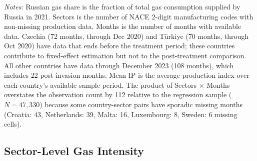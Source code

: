 \documentclass[12pt]{article}
\begin{document}
\begin{table}[H]
\begin{threeparttable}
\begin{tablenotes}[flushleft]
\item \textit{Notes:} Russian gas share is the fraction of total gas consumption supplied by Russia in 2021. Sectors is the number of NACE 2-digit manufacturing codes with non-missing production data. Months is the number of months with available data. Czechia (72 months, through Dec 2020) and T\"{u}rkiye (70 months, through Oct 2020) have data that ends before the treatment period; these countries contribute to fixed-effect estimation but not to the post-treatment comparison. All other countries have data through December 2023 (108 months), which includes 22 post-invasion months. Mean IP is the average production index over each country's available sample period. The product of Sectors $\times$ Months overstates the observation count by 112 relative to the regression sample ($N = 47{,}330$) because some country-sector pairs have sporadic missing months (Croatia: 43, Netherlands: 39, Malta: 16, Luxembourg: 8, Sweden: 6 missing cells).
\end{tablenotes}
\end{threeparttable}
\end{table}

\subsection{Sector-Level Gas Intensity}
\end{document}
